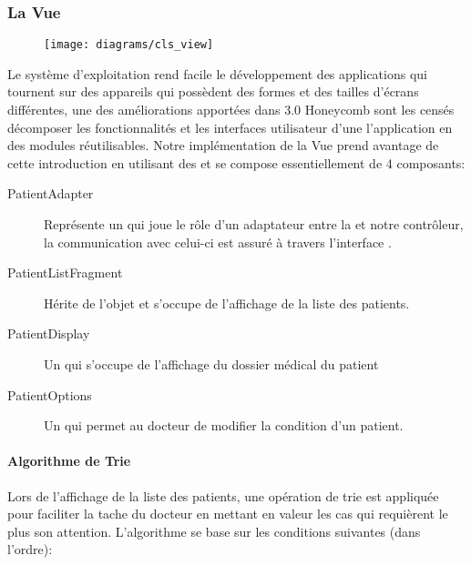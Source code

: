 \subsubsection{La Vue}

\begin{figure}
\center
\texttt{[image: diagrams/cls\_view]}
\end{figure}

Le système d'exploitation \android{} rend facile le développement des applications qui tournent sur des appareils qui possèdent des formes et des tailles d’écrans différentes, une des améliorations apportées dans \android{} 3.0 Honeycomb sont les  censés décomposer les fonctionnalités et les interfaces utilisateur d'une l'application \android{} en des modules réutilisables. Notre implémentation de la Vue prend avantage de cette introduction en utilisant des  et se compose essentiellement de 4 composants:

\begin{description}

\item[PatientAdapter] Représente un  qui joue le rôle d'un adaptateur entre la  et notre contrôleur, la communication avec celui-ci est assuré à travers l'interface .

\item[PatientListFragment] Hérite de l'objet  et s'occupe de l'affichage de la liste des patients.

\item[PatientDisplay] Un  qui s'occupe de l'affichage du dossier médical du patient

\item[PatientOptions] Un  qui permet au docteur de modifier la condition d'un patient.

\end{description}

\paragraph{Algorithme de Trie}

Lors de l'affichage de la liste des patients, une opération de trie est appliquée pour faciliter la tache du docteur en mettant en valeur les cas qui requièrent le plus son attention.
L’algorithme se base sur les conditions suivantes (dans l'ordre):

